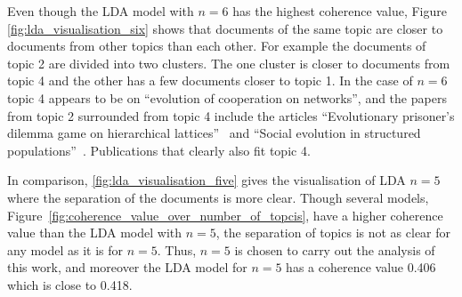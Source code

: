 \documentclass{article}
\theoremstyle{definition}
\begin{document}
Even though the LDA model with \(n=6\) has the highest coherence value, Figure
\ref{fig:lda_visualisation_six} shows that documents of the same topic are
closer to documents from other topics than each other. For example the documents
of topic 2 are divided into two clusters. The one cluster is closer to documents
from topic 4 and the other has a few documents closer to topic 1. In the case of \(n=6\)
topic 4 appears to be on ``evolution of cooperation on networks'', and the
papers from topic 2 surrounded from topic 4 include the articles
``Evolutionary prisoner's dilemma game on hierarchical lattices''~\cite{Vukov2005}
and ``Social evolution in structured populations''~\cite{Debarre2014}. Publications
that clearly also fit topic 4.

In comparison,
\ref{fig:lda_visualisation_five} gives the visualisation of LDA \(n=5\) where
the separation of the documents is more clear. Though
several models, Figure~\ref{fig:coherence_value_over_number_of_topcis}, have a
higher coherence value than the LDA model with \(n=5\), the separation
of topics is not as clear for any model as it is for \(n=5\). Thus, \(n=5\) is
chosen to carry out the analysis of this work, and moreover the LDA model for
\(n=5\) has a coherence value 0.406 which is close to 0.418.
\end{document}
